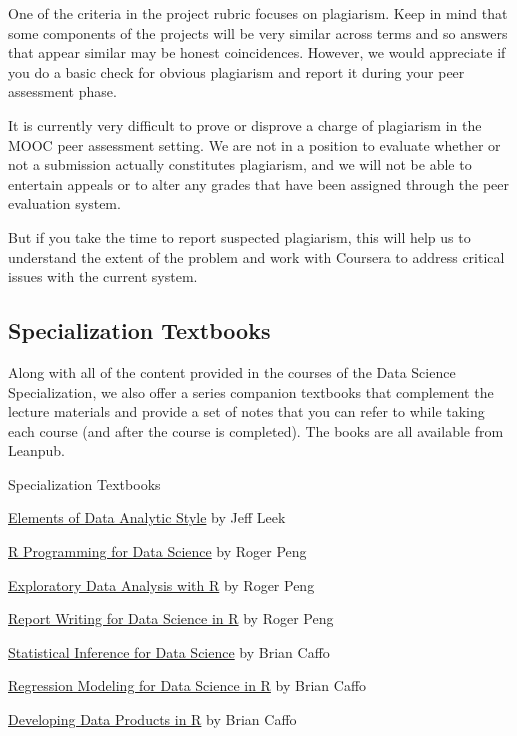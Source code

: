 One of the criteria in the project rubric focuses on plagiarism. Keep in mind that some components of the projects will be very similar across terms and so answers that appear similar may be honest coincidences. However, we would appreciate if you do a basic check for obvious plagiarism and report it during your peer assessment phase.

It is currently very difficult to prove or disprove a charge of plagiarism in the MOOC peer assessment setting. We are not in a position to evaluate whether or not a submission actually constitutes plagiarism, and we will not be able to entertain appeals or to alter any grades that have been assigned through the peer evaluation system.

But if you take the time to report suspected plagiarism, this will help us to understand the extent of the problem and work with Coursera to address critical issues with the current system.


\subsection{Specialization Textbooks}

Along with all of the content provided in the courses of the Data Science Specialization, we also offer a series companion textbooks that complement the lecture materials and provide a set of notes that you can refer to while taking each course (and after the course is completed). The books are all available from Leanpub.

Specialization Textbooks
\begin{nitemize}
\item    \href{https://leanpub.com/datastyle}{Elements of Data Analytic Style} by Jeff Leek
\item    \href{https://leanpub.com/rprogramming?utm_source=DST2&utm_medium=Reading&utm_campaign=DST2}{R Programming for Data Science} by Roger Peng
\item    \href{https://leanpub.com/exdata?utm_source=DST2&utm_medium=Reading&utm_campaign=DST2}{Exploratory Data Analysis with R} by Roger Peng
\item    \href{https://leanpub.com/reportwriting?utm_source=DST2&utm_medium=Reading&utm_campaign=DST2}{Report Writing for Data Science in R} by Roger Peng
\item    \href{https://leanpub.com/LittleInferenceBook}{Statistical Inference for Data Science} by Brian Caffo
\item    \href{https://leanpub.com/regmods}{Regression Modeling for Data Science in R} by Brian Caffo
\item    \href{https://leanpub.com/ddp}{Developing Data Products in R} by Brian Caffo
\end{nitemize}

